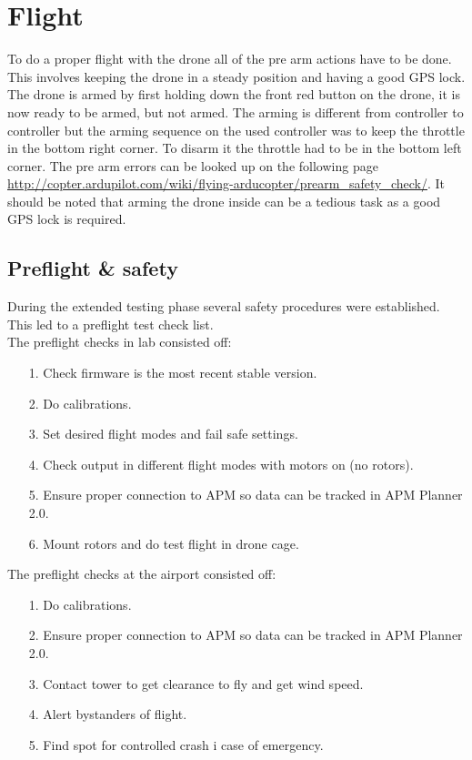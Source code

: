 \section{Flight}
To do a proper flight with the drone all of the pre arm actions have to be done. This involves keeping the drone in a steady position and having a good GPS lock. The drone is armed by first holding down the front red button on the drone, it is now ready to be armed, but not armed. The arming is different from controller to controller but the arming sequence on the used controller was to keep the throttle in the bottom right corner. To disarm it the throttle had to be in the bottom left corner. The pre arm errors can be looked up on the following page \url{http://copter.ardupilot.com/wiki/flying-arducopter/prearm_safety_check/}. It should be noted that arming the drone inside can be a tedious task as a good GPS lock is required.\\ 

\subsection{Preflight \& safety}
During the extended testing phase several safety procedures were established. This led to a preflight test check list.\\
The preflight checks in lab consisted off:
\begin{itemize}
\item[1.] Check firmware is the most recent stable version.
\item[2.] Do calibrations.
\item[3.] Set desired flight modes and fail safe settings.
\item[4.] Check output in different flight modes with motors on (no rotors).
\item[5.] Ensure proper connection to APM so data can be tracked in APM Planner 2.0.
\item[6.] Mount rotors and do test flight in drone cage.
\end{itemize}

The preflight checks at the airport consisted off:
\begin{itemize}
\item[1.] Do calibrations.
\item[2.] Ensure proper connection to APM so data can be tracked in APM Planner 2.0.
\item[3.] Contact tower to get clearance to fly and get wind speed.
\item[4.] Alert bystanders of flight.
\item[5.] Find spot for controlled crash i case of emergency.
\end{itemize}

